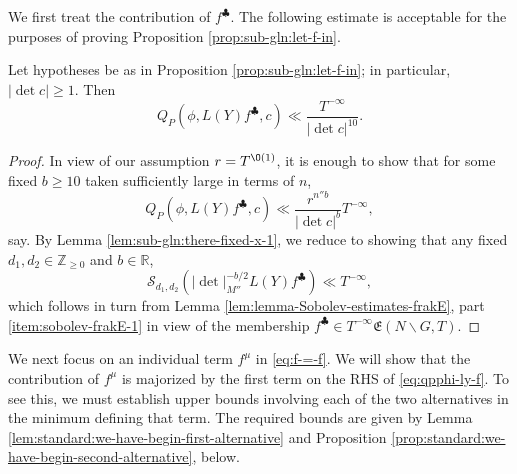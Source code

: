 We first treat the contribution of $f^{\clubsuit}$.  The following estimate is acceptable for the purposes of proving Proposition \ref{prop:sub-gln:let-f-in}.
\begin{lemma}\label{lemma:20230514162239}
  Let hypotheses be as in Proposition \ref{prop:sub-gln:let-f-in}; in particular, $\lvert \det c \rvert \geq 1$.  Then
  \begin{equation*}
    Q_P(\phi, L(Y) f^{\clubsuit},c) \ll
    \frac{T^{-\infty}}{|\det c|^{10}}.
  \end{equation*}
\end{lemma}
\begin{proof}
  In view of our assumption $r = T^{\O(1)}$, it is enough to show that for some fixed $b \geq 10$ taken sufficiently large in terms of $n$,
  \begin{equation*}
    Q_P(\phi, L(Y) f^{\clubsuit},c) \ll
    \frac{r^{n'' b}}{|\det c|^{b}} T^{-\infty},
  \end{equation*}
  say.  By Lemma \ref{lem:sub-gln:there-fixed-x-1}, we reduce to showing that any fixed $d_1,d_2 \in \mathbb{Z}_{\geq 0}$ and $b \in \mathbb{R}$,
  \begin{equation}\label{eq:estimate-clubsuit-contribution-trivially}
    \mathcal{S}_{d_1, d_2}(|\det|_{M''}^{-b/2} L(Y) f^{\clubsuit})
    \ll T^{-\infty},
  \end{equation}
  which follows in turn from Lemma \ref{lem:lemma-Sobolev-estimates-frakE}, part \eqref{item:sobolev-frakE-1} in view of the membership $f^{\clubsuit} \in T^{-\infty} \mathfrak{E}(N \backslash G, T)$.
\end{proof}

We next focus on an individual term $f^{\mu}$ in \eqref{eq:f-=-f}.  We will show that the contribution of $f^\mu$ is majorized by the first term on the RHS of \eqref{eq:qpphi-ly-f}.  To see this, we must establish upper bounds involving each of the two alternatives in the minimum defining that term.  The required bounds are given by Lemma \ref{lem:standard:we-have-begin-first-alternative} and Proposition \ref{prop:standard:we-have-begin-second-alternative}, below.


